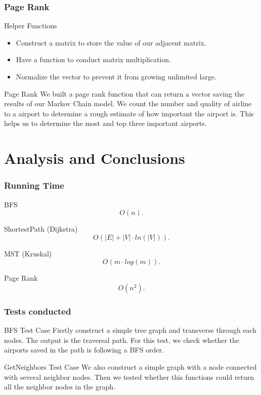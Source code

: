 \documentclass{beamer}
\begin{document}
\begin{frame}
\frametitle{Page Rank}
\begin{block}{Helper Functions}
    \begin{itemize}
            \item Construct a matrix to store the value of our adjacent matrix. 
            \item Have a function to conduct matrix multiplication.
            \item Normalize the vector to prevent it from growing unlimited large.
        \end{itemize}
\end{block}
\begin{block}{Page Rank}
    We built a page rank function that can return a vector saving the results of our Markov Chain model. We count the number and quality of airline to a airport to determine a rough estimate of how important the airport is. This helps us to determine the most and top three important airports.
\end{block}
\end{frame}




\section{Analysis and Conclusions}
\begin{frame}

\frametitle{Running Time}
\begin{block}{BFS}
    $$O(n).$$
\end{block}

\begin{block}{ShortestPath (Dijkstra)}
    $$O(|E|+|V|\cdot ln(|V|)).$$
\end{block}

\begin{block}{MST (Kruskal)}
    $$O(m\cdot log(m)).$$
\end{block}

\begin{block}{Page Rank}
    $$O(n^2).$$
\end{block}

\end{frame}

\begin{frame}
\frametitle{Tests conducted}
\begin{block}{BFS Test Case}
    Firstly construct a simple tree graph and transverse through each nodes. The output is the traversal path. For this test, we check whether the airports saved in the path is following a BFS order.
\end{block}
\begin{block}{GetNeighbors Test Case}
    We also construct a simple graph with a node connected with several neighbor nodes. Then we tested whether this functions could return all the neighbor nodes in the graph.
\end{block}
\end{frame}
\end{document}
